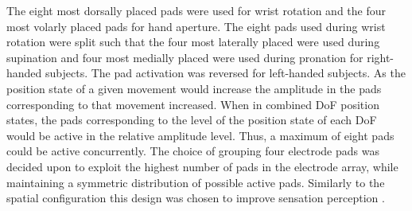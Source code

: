 The eight most dorsally placed pads were used for wrist rotation and the four most volarly placed pads for hand aperture. The eight pads used during wrist rotation were split such that the four most laterally placed were used during supination and four most medially placed were used during pronation for right-handed subjects. The pad activation was reversed for left-handed subjects. As the position state of a given movement would increase the amplitude in the pads corresponding to that movement increased. When in combined DoF position states, the pads corresponding to the level of the position state of each DoF would be active in the relative amplitude level. Thus, a maximum of eight pads could be active concurrently. The choice of grouping four electrode pads was decided upon to exploit the highest number of pads in the electrode array, while maintaining a symmetric distribution of possible active pads. Similarly to the spatial configuration this design was chosen to improve sensation perception \cite{Dosen2015}.


